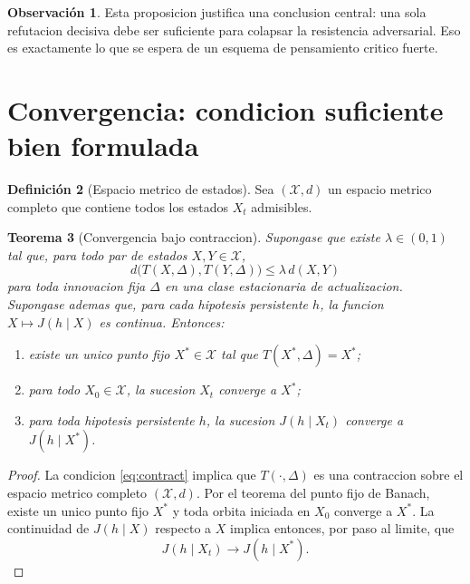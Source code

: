 \documentclass[12pt,a4paper]{article}
\theoremstyle{definition}
\newtheorem{definition}{Definici\'on}[section]
\newtheorem{remark}[definition]{Observaci\'on}
\theoremstyle{plain}
\newtheorem{theorem}[definition]{Teorema}
\theoremstyle{remark}
\begin{document}
\begin{remark}
Esta proposicion justifica una conclusion central: una sola refutacion decisiva debe ser suficiente para colapsar la resistencia adversarial. Eso es exactamente lo que se espera de un esquema de pensamiento critico fuerte.
\end{remark}

\section{Convergencia: condicion suficiente bien formulada}


\begin{definition}[Espacio metrico de estados]
Sea $(\mathcal{X},d)$ un espacio metrico completo que contiene todos los estados $X_t$ admisibles.
\end{definition}

\begin{theorem}[Convergencia bajo contraccion]
Supongase que existe $\lambda\in(0,1)$ tal que, para todo par de estados $X,Y\in\mathcal{X}$,
\begin{equation}\label{eq:contract}
d\bigl(T(X,\Delta),T(Y,\Delta)\bigr)\le \lambda\, d(X,Y)
\end{equation}
para toda innovacion fija $\Delta$ en una clase estacionaria de actualizacion. Supongase ademas que, para cada hipotesis persistente $h$, la funcion $X\mapsto J(h\mid X)$ es continua. Entonces:
\begin{enumerate}[label=(\roman*),leftmargin=1.7em]
    \item existe un unico punto fijo $X^*\in\mathcal{X}$ tal que $T(X^*,\Delta)=X^*$;
    \item para todo $X_0\in\mathcal{X}$, la sucesion $X_t$ converge a $X^*$;
    \item para toda hipotesis persistente $h$, la sucesion $J(h\mid X_t)$ converge a $J(h\mid X^*)$.
\end{enumerate}
\end{theorem}

\begin{proof}
La condicion \eqref{eq:contract} implica que $T(\cdot,\Delta)$ es una contraccion sobre el espacio metrico completo $(\mathcal{X},d)$. Por el teorema del punto fijo de Banach, existe un unico punto fijo $X^*$ y toda orbita iniciada en $X_0$ converge a $X^*$. La continuidad de $J(h\mid X)$ respecto a $X$ implica entonces, por paso al limite, que
\begin{equation}
J(h\mid X_t)\longrightarrow J(h\mid X^*).
\end{equation}
\end{proof}
\end{document}
